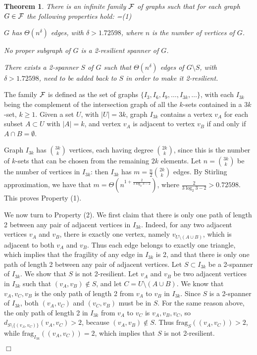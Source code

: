 \documentclass{article}
\newcommand{\dist}          {d}
\newcommand{\frag}          {\mathrm{frag}}
\newtheorem{theorem}{Theorem}
\newcommand{\qed}{\hfill \ensuremath{\Box}}
\newenvironment{proof}{\vspace{1ex}\noindent{\bf Proof.}\hspace{0.5em}}
	{\hfill\qed\vspace{2ex}}
\newenvironment{mylist}[1]{
\setbox1=\hbox{#1}
\begin{list}{}{
\setlength{\labelwidth}{\wd1}
\setlength{\leftmargin}{\wd1}
\addtolength{\leftmargin}{0em}
\addtolength{\leftmargin}{\labelsep}
\setlength{\rightmargin}{1em}}}{\end{list}}
\newcommand{\litem}[1]{\item[#1\hfill]}
\begin{document}
\begin{theorem}\label{th:lowerbound}
There is an infinite family $\cal{F}$ of graphs such that for each graph $G \in \cal{F}$ the following properties hold:
\begin{mylist}{(1)}
	\litem{(1)}  $G$ has $\Theta(n^{\delta})$ edges, with $\delta>1.72598$, where $n$ is the number of vertices of $G$.
	\litem{(2)} No proper subgraph of $G$ is a 2-resilient spanner of $G$.
	\litem{(3)} There exists a 2-spanner $S$ of $G$ such that  $\Theta(n^{\delta})$ edges of $G\setminus S$, with $\delta>1.72598$, need to be added back to $S$ in order to make it 2-resilient.
\end{mylist}
\end{theorem}
\begin{proof}
The family $\cal{F}$ is defined as the set of graphs $\{I_3, I_6, I_9, \ldots, I_{3k}, \ldots\}$, with each $I_{3k}$ being the complement of the intersection graph of all the $k$-sets contained in a $3k$-set, $k\geq 1$. Given a set $U$, with $|U|=3k$, graph $I_{3k}$ contains a vertex $v_A$ for each subset $A \subset U$ with $|A| = k$, and vertex $v_A$ is adjacent to vertex $v_B$ if and only if $A\cap B = \emptyset$.

	Graph $I_{3k}$ has ${3k \choose k}$ vertices, each having degree ${2k \choose k}$, since this is the number of $k$-sets that can be chosen from the remaining $2k$ elements. Let $n={3k \choose k}$ be the number of vertices in $I_{3k}$: then $I_{3k}$ has
$m = \frac{n}{2} {2k \choose k}$ edges. By Stirling approximation,
we have that $m = \Theta\left(n^{1 + \frac{2}{3 \log_2 3 -2}}\right)$, where $\frac{2}{3 \log_2 3 -2} > 0.72598$. This proves Property (1).

We now turn to Property (2). We first claim that there is only one path of length 2 between any pair of adjacent vertices in $I_{3k}$. Indeed,  for any two adjacent vertices $v_A$ and $v_B$, there is exactly one vertex, namely $v_{U\setminus(A \cup B)}$, which is adjacent to both $v_A$ and $v_B$. Thus each edge belongs to exactly one triangle, which implies that the fragility of any edge in $I_{3k}$ is 2, and that there is only one path of length 2 between any pair of adjacent vertices.
Let $S\subset I_{3k}$ be a 2-spanner of $I_{3k}$. We show that $S$ is not 2-resilient.
Let $v_A$ and $v_B$ be two adjacent vertices in $I_{3k}$ such that $(v_A, v_B) \not\in S$, and let $C = U \setminus (A \cup B)$.
We know that $v_A, v_C, v_B$ is the only path of length 2 from $v_A$ to $v_B$ in $I_{3k}$. Since $S$ is a 2-spanner of $I_{3k}$, both $(v_A, v_C)$ and $(v_C, v_B)$ must be in $S$.
For the same reason above, the only path of length 2 in $I_{3k}$ from $v_A$ to $v_C$ is $v_A, v_B, v_C$,
so $\dist_{S\setminus\{(v_A, v_C)\}}(v_A, v_C) > 2$, because $(v_A, v_B) \not\in S$. Thus $\frag_S((v_A, v_C)) > 2$, while $\frag_{I_{3k}}((v_A, v_C)) = 2$, which implies that $S$ is not 2-resilient.


\end{proof}
\end{document}
